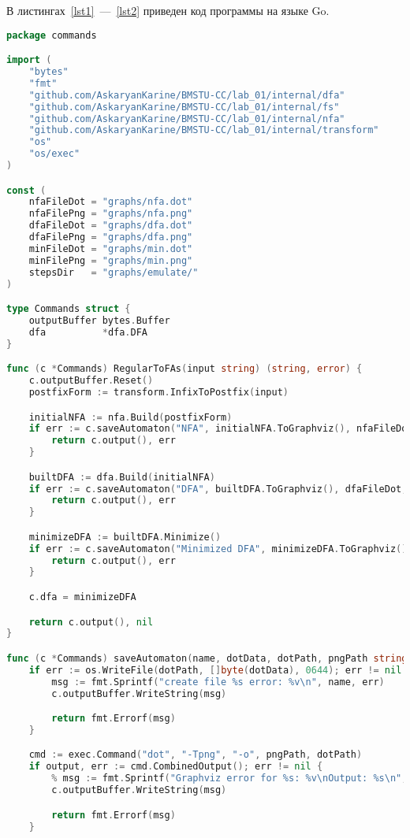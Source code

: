 В листингах~\ref{lst1}~---~\ref{lst2} приведен код программы на языке Go.

\begin{lstlisting}[language=Go, caption={Код модуля \textit{commands}}, label=lst1]
package commands

import (
	"bytes"
	"fmt"
	"github.com/AskaryanKarine/BMSTU-CC/lab_01/internal/dfa"
	"github.com/AskaryanKarine/BMSTU-CC/lab_01/internal/fs"
	"github.com/AskaryanKarine/BMSTU-CC/lab_01/internal/nfa"
	"github.com/AskaryanKarine/BMSTU-CC/lab_01/internal/transform"
	"os"
	"os/exec"
)

const (
	nfaFileDot = "graphs/nfa.dot"
	nfaFilePng = "graphs/nfa.png"
	dfaFileDot = "graphs/dfa.dot"
	dfaFilePng = "graphs/dfa.png"
	minFileDot = "graphs/min.dot"
	minFilePng = "graphs/min.png"
	stepsDir   = "graphs/emulate/"
)

type Commands struct {
	outputBuffer bytes.Buffer
	dfa          *dfa.DFA
}

func (c *Commands) RegularToFAs(input string) (string, error) {
	c.outputBuffer.Reset()
	postfixForm := transform.InfixToPostfix(input)

	initialNFA := nfa.Build(postfixForm)
	if err := c.saveAutomaton("NFA", initialNFA.ToGraphviz(), nfaFileDot, nfaFilePng); err != nil {
		return c.output(), err
	}

	builtDFA := dfa.Build(initialNFA)
	if err := c.saveAutomaton("DFA", builtDFA.ToGraphviz(), dfaFileDot, dfaFilePng); err != nil {
		return c.output(), err
	}

	minimizeDFA := builtDFA.Minimize()
	if err := c.saveAutomaton("Minimized DFA", minimizeDFA.ToGraphviz(), minFileDot, minFilePng); err != nil {
		return c.output(), err
	}

	c.dfa = minimizeDFA

	return c.output(), nil
}

func (c *Commands) saveAutomaton(name, dotData, dotPath, pngPath string) error {
	if err := os.WriteFile(dotPath, []byte(dotData), 0644); err != nil {
		msg := fmt.Sprintf("create file %s error: %v\n", name, err)
		c.outputBuffer.WriteString(msg)

		return fmt.Errorf(msg)
	}

	cmd := exec.Command("dot", "-Tpng", "-o", pngPath, dotPath)
	if output, err := cmd.CombinedOutput(); err != nil {
		% msg := fmt.Sprintf("Graphviz error for %s: %v\nOutput: %s\n", name, err, string(output))
		c.outputBuffer.WriteString(msg)

		return fmt.Errorf(msg)
	}


\end{lstlisting}
